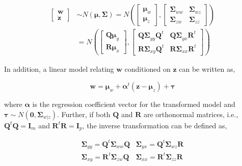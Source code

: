 \documentclass[review]{elsarticle}
\theoremstyle{definition}
\theoremstyle{definition}
\theoremstyle{definition}
\theoremstyle{remark}
\begin{document}
\begin{align}
  \begin{bmatrix}\mathbf{w} \\
  \mathbf{z}\end{bmatrix}  & \sim N \left(\boldsymbol{\mu}, \boldsymbol{\Sigma}\right)
  = N \left(
    \begin{bmatrix}
      \boldsymbol{\mu}_w \\ \boldsymbol{\mu}_z
    \end{bmatrix},
    \begin{bmatrix}
      \boldsymbol{\Sigma}_{ww} & \boldsymbol{\Sigma}_{wz} \\
      \boldsymbol{\Sigma}_{zw} & \boldsymbol{\Sigma}_{zz}
    \end{bmatrix} \right) \nonumber \\
  &= N \left(
    \begin{bmatrix}
      \boldsymbol{Q\mu}_y \\
      \boldsymbol{R\mu}_x
    \end{bmatrix},
    \begin{bmatrix}
      \boldsymbol{Q\Sigma}_{yy}\boldsymbol{Q}^t & \boldsymbol{Q\Sigma}_{yx}\mathbf{R}^t \\
      \boldsymbol{R\Sigma}_{xy}\boldsymbol{Q}^t & \boldsymbol{R\Sigma}_{xx}\mathbf{R}^t
    \end{bmatrix}
  \right)
  \label{eq:model3}
\end{align}

In addition, a linear model relating \(\mathbf{w}\) conditioned on
\(\mathbf{z}\) can be written as,

\begin{equation}
\mathbf{w} =  \boldsymbol{\mu}_w + \boldsymbol{\alpha}^t \left(\mathbf{z} - \boldsymbol{\mu}_z\right) + \boldsymbol{\tau}
\label{eq:latent-model}
\end{equation}

where \(\boldsymbol{\alpha}\) is the regression coefficient vector for
the transformed model and
\(\boldsymbol{\tau} \sim N\left(\mathbf{0}, \boldsymbol{\Sigma}_{w|z}\right)\).
Further, if both \(\mathbf{Q}\) and \(\mathbf{R}\) are orthonormal
matrices, i.e., \(\mathbf{Q}^t\mathbf{Q} = \mathbf{I}_m\) and
\(\mathbf{R}^t\mathbf{R} = \mathbf{I}_p\), the inverse transformation
can be defined as,

\begin{equation}
  \begin{matrix}
    \boldsymbol{\Sigma}_{yy} = \mathbf{Q}^t \boldsymbol{\Sigma}_{ww} \mathbf{Q} &
    \boldsymbol{\Sigma}_{yx} = \mathbf{Q}^t \boldsymbol{\Sigma}_{wz} \mathbf{R} \\
    \boldsymbol{\Sigma}_{xy} = \mathbf{R}^t \boldsymbol{\Sigma}_{zw} \mathbf{Q} &
    \boldsymbol{\Sigma}_{xx} = \mathbf{R}^t \boldsymbol{\Sigma}_{zz} \mathbf{R}
  \end{matrix}
  \label{eq:cov-yx-wz}
\end{equation}
\end{document}

